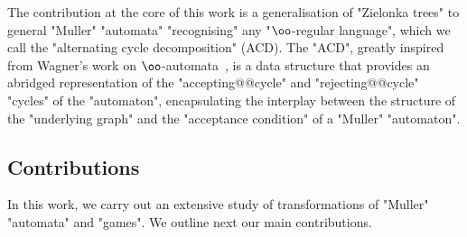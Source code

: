 \documentclass{theoretics}
\begin{document}
The contribution at the core of this work is a generalisation of "Zielonka trees" to general "Muller" "automata" "recognising" any "$\oo$-regular language", which we call the "alternating cycle decomposition" (ACD). The "ACD", greatly inspired from Wagner's work on $\oo$-automata~\cite{Wagner1979omega}, is a data structure that provides an abridged representation of the "accepting@@cycle" and "rejecting@@cycle" "cycles" of the "automaton", encapsulating the interplay between the structure of the "underlying graph"  and the "acceptance condition" of a "Muller" "automaton".


\subsection*{Contributions}
In this work, we carry out an extensive study of transformations of "Muller" "automata" and "games". We outline next our main contributions.
\end{document}
